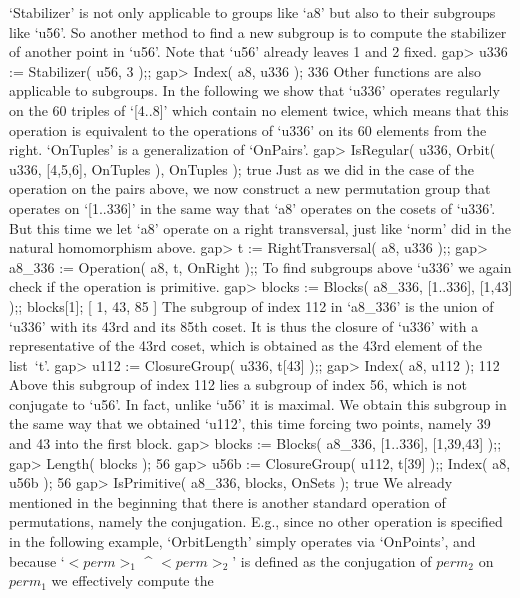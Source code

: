 `Stabilizer' is not only applicable to groups like `a8' but also to their
subgroups like  `u56'. So another  method  to find  a  new subgroup is to
compute the stabilizer of another point in `u56'. Note that `u56' already
leaves 1 and 2 fixed.
\beginexample
    gap> u336 := Stabilizer( u56, 3 );;
    gap> Index( a8, u336 );
    336 
\endexample
Other functions  are also  applicable to subgroups.  In  the following we
show that  `u336' operates regularly on the  60 triples of `[4..8]' which
contain no  element twice, which  means that this operation is equivalent
to the operations of `u336' on its 60 elements from the right. `OnTuples'
is a generalization of `OnPairs'.
\beginexample
    gap> IsRegular( u336, Orbit( u336, [4,5,6], OnTuples ), OnTuples );
    true 
\endexample
Just as we did in the  case of the  operation on the  pairs above, we now
construct a new permutation group that operates on `[1..336]' in the same
way that `a8' operates on the cosets of `u336'. But this time we let `a8'
operate  on a right   transversal, just like  `norm'  did in  the natural
homomorphism above.
\beginexample
    gap> t := RightTransversal( a8, u336 );;
    gap> a8_336 := Operation( a8, t, OnRight );;
\endexample
To find  subgroups above  `u336'  we  again  check if  the  operation  is
primitive.
\beginexample
    gap> blocks := Blocks( a8_336, [1..336], [1,43] );;  blocks[1];
    [ 1, 43, 85 ]
\endexample
The subgroup of index  112 in `a8\_336' is the  union of `u336' with  its
43rd and  its  85th coset. It   is  thus the   closure of  `u336' with  a
representative of the  43rd coset, which is  obtained as the 43rd element
of the list~`t'.
\beginexample
    gap> u112 := ClosureGroup( u336, t[43] );;
    gap> Index( a8, u112 );
    112 
\endexample
Above this subgroup of index 112 lies a  subgroup  of index 56, which  is
not conjugate to `u56'.  In fact, unlike `u56' it is  maximal.  We obtain
this subgroup in  the same way that we obtained `u112', this time forcing
two points, namely 39 and 43 into the first block.
\beginexample
    gap> blocks := Blocks( a8_336, [1..336], [1,39,43] );;
    gap> Length( blocks );
    56
    gap> u56b := ClosureGroup( u112, t[39] );; Index( a8, u56b );
    56
    gap> IsPrimitive( a8_336, blocks, OnSets );
    true 
\endexample
We already   mentioned in the beginning  that  there is  another standard
operation of permutations,  namely the conjugation.  E.g., since no other
operation is specified   in the following  example, `OrbitLength'  simply
operates via `OnPoints', and because `$<perm>_1$ ^ $<perm>_2$' is defined
as  the  conjugation of $perm_2$  on  $perm_1$ we effectively compute the
